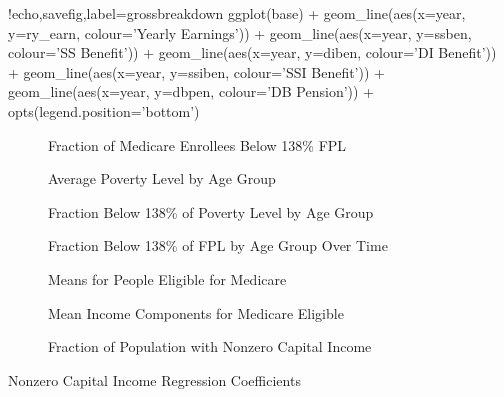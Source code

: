 \documentclass{article}
\begin{document}
\begin{Rcode}{!echo,savefig,label=grossbreakdown}
ggplot(base) + 
geom_line(aes(x=year, y=ry_earn, colour='Yearly Earnings')) +
geom_line(aes(x=year, y=ssben, colour='SS Benefit')) + 
geom_line(aes(x=year, y=diben, colour='DI Benefit')) +
geom_line(aes(x=year, y=ssiben, colour='SSI Benefit')) +
geom_line(aes(x=year, y=dbpen, colour='DB Pension')) +
opts(legend.position='bottom')
\end{Rcode}

\begin{figure}[ht]
\centering
{}
\caption{Fraction of Medicare Enrollees Below 138\% FPL}
\label{fig:exemptions}
\end{figure}

\begin{figure}[ht]
\centering
{}
\caption{Average Poverty Level by Age Group}
\label{fig:poverty}
\end{figure}

\begin{figure}[ht]
\centering
{}
\caption{Fraction Below 138\% of Poverty Level by Age Group}
\label{fig:povertyfrac}
\end{figure}

\begin{figure}[ht]
\centering
{}
\caption{Fraction Below 138\% of FPL by Age Group Over Time}
\end{figure}

\begin{figure}[ht]
\centering
{}
\caption{Means for People Eligible for Medicare}
\label{fig:oldincome}
\end{figure}

\begin{figure}[ht]
\centering
{}
\caption{Mean Income Components for Medicare Eligible}
\label{fig:grossbreakdown}
\end{figure}

\begin{figure}[ht]
\centering
{}
\caption{Fraction of Population with Nonzero Capital Income}
\end{figure}

\begin{table}[ht]
\centering
\caption{Nonzero Capital Income Regression Coefficients}

\label{tab:hicapnonzero}
\end{table}
\end{document}
